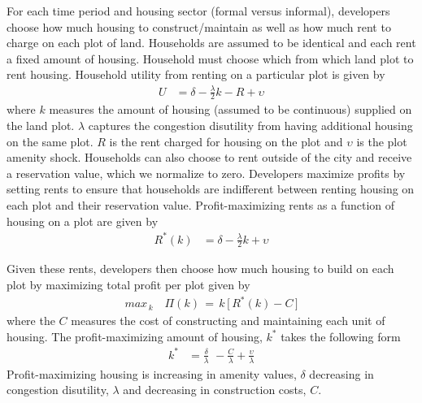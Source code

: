 \documentclass[12pt]{article}
\begin{document}
For each time period and housing sector (formal versus informal), developers choose how much housing to construct/maintain as well as how much rent to charge on each plot of land.  Households are assumed to be identical and each rent a fixed amount of housing.  Household must choose which from which land plot to rent housing.  Household utility from renting on a particular plot is given by
\begin{align*}
U &= \delta - \frac{\lambda}{2} k - R   + \upsilon 
\end{align*}
where $k$ measures the amount of housing (assumed to be continuous) supplied on the land plot.  $\lambda$ captures the congestion disutility from having additional housing on the same plot.   $R$ is the rent charged for housing on the plot and $\upsilon$ is the plot amenity shock.  Households can also choose to rent outside of the city and receive a reservation value, which we normalize to zero.  Developers maximize profits by setting rents to ensure that households are indifferent between renting housing on each plot and their reservation value.  Profit-maximizing rents as a function of housing on a plot are given by
\begin{align*}
R^{*}(k) &= \delta - \frac{\lambda}{2} k + \upsilon
\end{align*}

Given these rents, developers then choose how much housing to build on each plot by maximizing total profit per plot given by
\begin{align*}
max_{\,k} \,\,\,\,\,\, \Pi(k) \,=\, k \, \Big[ \, R^{*}(k) - C \, \Big ]
\end{align*}
\noindent where the $C$ measures the cost of constructing and maintaining each unit of housing.  The profit-maximizing amount of housing, $k^{*}$ takes the following form
\begin{align}
\label{eq:kstar}
k^{*} &= \frac{\delta}{\lambda} \,\, - \frac{C}{\lambda} + \frac{\upsilon}{\lambda}
\end{align}
Profit-maximizing housing is increasing in amenity values, $\delta$ decreasing in congestion disutility, $\lambda$ and decreasing in construction costs, $C$.  
\end{document}
